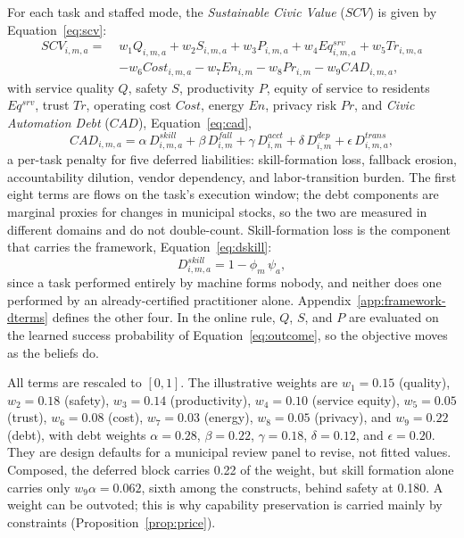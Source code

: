 \documentclass[utf8]{FrontiersinHarvard}
\begin{document}
	For each task and staffed mode, the \textit{Sustainable Civic Value} ($SCV$) is given by Equation~\eqref{eq:scv}:
	\begin{equation}
		\begin{split}
			SCV_{i,m,a} =\;&
			w_1 Q_{i,m,a}
			+w_2 S_{i,m,a}
			+w_3 P_{i,m,a}
			+w_4 Eq^{srv}_{i,m,a}
			+w_5 Tr_{i,m,a}\\
			&-w_6 Cost_{i,m,a}
			-w_7 En_{i,m}
			-w_8 Pr_{i,m}
			-w_9 CAD_{i,m,a},
		\end{split}
		\label{eq:scv}
	\end{equation}
	with service quality $Q$, safety $S$, productivity $P$, equity of service to residents $Eq^{srv}$, trust $Tr$, operating cost $Cost$, energy $En$, privacy risk $Pr$, and \textit{Civic Automation Debt} ($CAD$), Equation~\eqref{eq:cad},
	\begin{equation}
		CAD_{i,m,a} =
		\alpha\,D^{skill}_{i,m,a}
		+\beta\,D^{fall}_{i,m}
		+\gamma\,D^{acct}_{i,m}
		+\delta\,D^{dep}_{i,m}
		+\epsilon\,D^{trans}_{i,m,a},
		\label{eq:cad}
	\end{equation}
	a per-task penalty for five deferred liabilities: skill-formation loss, fallback erosion, accountability dilution, vendor dependency, and labor-transition burden. The first eight terms are flows on the task's execution window; the debt components are marginal proxies for changes in municipal stocks, so the two are measured in different domains and do not double-count. Skill-formation loss is the component that carries the framework, Equation~\eqref{eq:dskill}:
	\begin{equation}
		D^{skill}_{i,m,a} = 1 - \phi_m\,\psi_a ,
		\label{eq:dskill}
	\end{equation}
	since a task performed entirely by machine forms nobody, and neither does one performed by an already-certified practitioner alone. Appendix~\ref{app:framework-dterms} defines the other four. In the online rule, $Q$, $S$, and $P$ are evaluated on the learned success probability of Equation~\eqref{eq:outcome}, so the objective moves as the beliefs do.

	All terms are rescaled to $[0,1]$. The illustrative weights are $w_1{=}0.15$ (quality), $w_2{=}0.18$ (safety), $w_3{=}0.14$ (productivity), $w_4{=}0.10$ (service equity), $w_5{=}0.05$ (trust), $w_6{=}0.08$ (cost), $w_7{=}0.03$ (energy), $w_8{=}0.05$ (privacy), and $w_9{=}0.22$ (debt), with debt weights $\alpha{=}0.28$, $\beta{=}0.22$, $\gamma{=}0.18$, $\delta{=}0.12$, and $\epsilon{=}0.20$. They are design defaults for a municipal review panel to revise, not fitted values. Composed, the deferred block carries 0.22 of the weight, but skill formation alone carries only $w_9\alpha=0.062$, sixth among the constructs, behind safety at 0.180. A weight can be outvoted; this is why capability preservation is carried mainly by constraints (Proposition~\ref{prop:price}).
\end{document}
